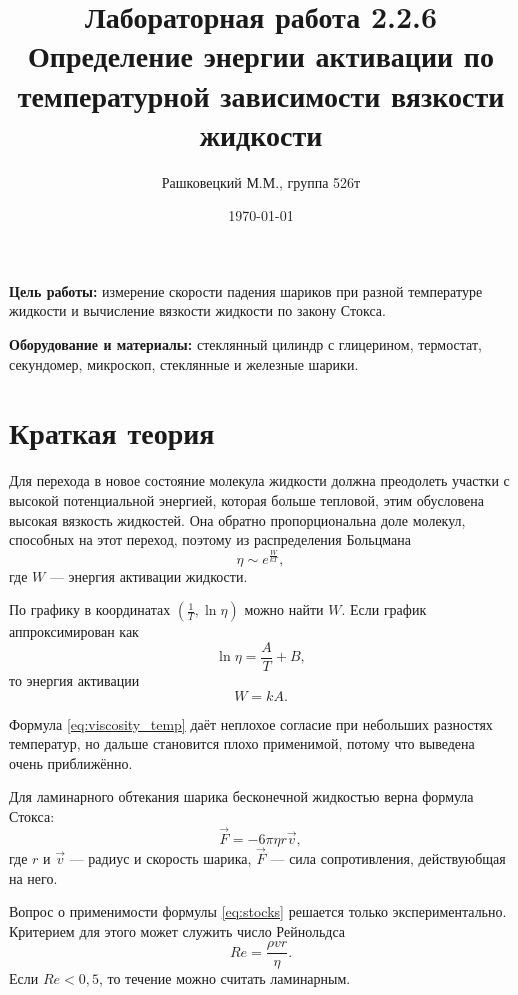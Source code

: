 \documentclass[12pt]{article}
\author{Рашковецкий М.М., группа 526т}
\date{\today}
\title{Лабораторная работа 2.2.6\\Определение энергии активации по температурной зависимости вязкости жидкости}
\begin{document}
	\maketitle
	
	{\parindent=1cm \hangindent=1cm \parskip=0.5cm
	{\bfseries Цель работы:} измерение скорости падения шариков при разной температуре жидкости и вычисление вязкости жидкости по закону Стокса.
	
	\hangindent=1cm
	{\bfseries Оборудование и материалы:} стеклянный цилиндр с глицерином, термостат, секундомер, микроскоп, стеклянные и железные шарики.\par}
	\section*{Краткая теория}
	
	\indent Для перехода в новое состояние молекула жидкости должна преодолеть участки с высокой потенциальной энергией, которая больше тепловой, этим обусловена высокая вязкость жидкостей. Она обратно пропорциональна доле молекул, способных на этот переход, поэтому из распределения Больцмана
	\begin{equation}
	\label{eq:viscosity_temp}
	\eta \sim e^\frac{W}{kT},
	\end{equation}
	где $W$ --- энергия активации жидкости.
	
	По графику в координатах $\left( \frac{1}{T}, \ln \eta \right)$ можно найти $W$. Если график аппроксимирован как
	\begin{equation}
	\label{eq:exp_linearisation}
	\ln \eta = \frac{A}{T}+B,
	\end{equation}
	то энергия активации
	\begin{equation}
	\label{eq:act_energy_from_exp}
	W=kA.
	\end{equation}
	
	Формула \eqref{eq:viscosity_temp} даёт неплохое согласие при небольших разностях температур, но дальше становится плохо применимой, потому что выведена очень приближённо.
	
	Для ламинарного обтекания шарика бесконечной жидкостью верна формула Стокса:
	\begin{equation}
	\label{eq:stocks}
	\vec{F}=-6\pi \eta r\vec{v},
	\end{equation}
	где $r$ и $\vec{v}$ --- радиус и скорость шарика, $\vec{F}$ --- сила сопротивления, действуюбщая на него.
	
	Вопрос о применимости формулы \eqref{eq:stocks} решается только экспериментально. Критерием для этого может  служить число Рейнольдса
	\begin{equation}
	\label{eq:reinolds}
	Re=\frac{\rho vr}{\eta}.
	\end{equation}
	Если $Re<0{,}5$, то течение можно считать ламинарным.
	
\end{document}
